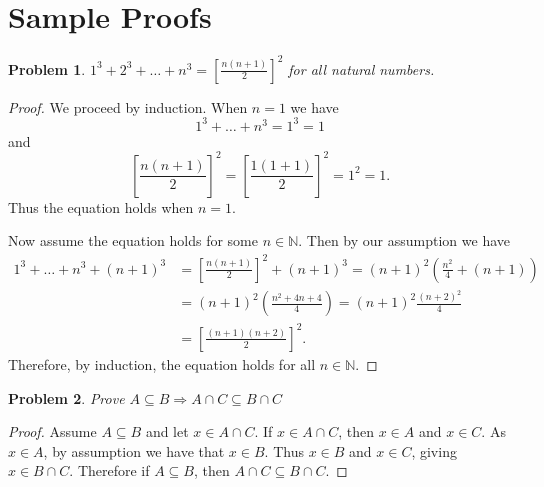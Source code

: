 \documentclass[12pt]{article}
\newcommand{\cont}{\subseteq}
\newtheorem{problem}{Problem}
\theoremstyle{remark}  %
\begin{document}
\section{Sample Proofs}
\begin{problem} $1^3+2^3+\ldots +n^3 = \left[ \frac{n(n+1)}{2}\right]^2$  for all natural numbers. 

\end{problem}
 
\begin{proof}
We proceed by induction. When $n=1$ we have 
$$
1^3 + \ldots + n^3 = 1^3 =1
$$
and
$$
\left[ \frac{n(n+1)}{2}\right]^2=\left[ \frac{1(1+1)}{2}\right]^2 = 1^2 =1.
$$
Thus the equation holds when $n=1$.

Now assume the equation holds for some $n \in \mathbb N$. Then by our assumption we have
\begin{align*}
1^3 + \ldots + n^3 + (n+1)^3& =   \left[ \frac{n(n+1)}{2}\right]^2 + (n+1)^3 = (n+1)^2\left( \frac{n^2}{4} + (n+1)\right) \\
&=(n+1)^2\left( \frac{n^2+4n+4}{4} \right) = (n+1)^2\frac{(n+2)^2}{4}  \\ &=  \left[ \frac{(n+1)(n+2)}{2}\right]^2.
\end{align*}
Therefore, by induction, the equation holds for all $n\in \mathbb N$.
\end{proof}

\begin{problem} Prove $A \subseteq B \Rightarrow A \cap C \cont B \cap C$
\end{problem}
\begin{proof} Assume $A \cont B $ and let $x\in A \cap C$. If $x \in  A \cap C$, then $x\in A$ and $x \in C$. As $x\in A$, by assumption we have that $x \in B$. Thus $x \in B$ and $x \in C$, giving $x\in B \cap C$. Therefore if $A \subseteq B $, then $A \cap C \cont B \cap C$.
\end{proof}

 
\fi
\end{document}
